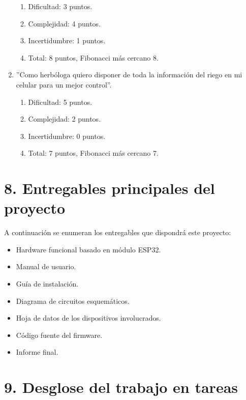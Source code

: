 \documentclass[
11pt, %
]{charter}
\begin{document}
\begin{enumerate}
	\begin{enumerate}
		\item Dificultad: 3 puntos.
		\item Complejidad: 4 puntos.
		\item Incertidumbre: 1 puntos.
		\item Total: 8 puntos, Fibonacci más cercano 8.
	\end{enumerate}
	\item ''Como herbóloga quiero disponer de toda la información del riego en mi celular para un mejor control''.
	\begin{enumerate}
		\item Dificultad: 5 puntos.
		\item Complejidad: 2 puntos.
		\item Incertidumbre: 0 puntos.
		\item Total: 7 puntos, Fibonacci más cercano 7.
	\end{enumerate}
\end{enumerate}

\section{8. Entregables principales del proyecto}
\label{sec:entregables}

A continuación se enumeran los entregables que dispondrá este proyecto:
\begin{itemize}
	\item Hardware funcional basado en módulo ESP32.
	\item Manual de usuario.
	\item Guía de instalación.
	\item Diagrama de circuitos esquemáticos.
	\item Hoja de datos de los dispositivos involucrados.
	\item Código fuente del firmware.
	\item Informe final.

\end{itemize}

\section{9. Desglose del trabajo en tareas}
\label{sec:wbs}
\end{document}
